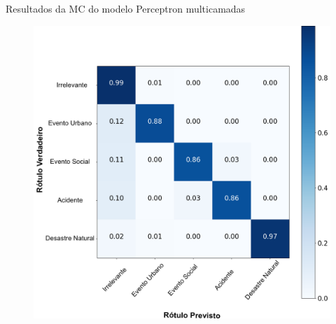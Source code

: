 \documentclass{beamer}
\begin{document}
\begin{frame}{Resultados da MC do modelo Perceptron multicamadas}
\begin{figure}[!htb]%
	\centering
		\includegraphics[width=0.66\linewidth]{confusion_matrix_mlp_pt.png}
	\label{fig:pizza_bus}
\end{figure}
\end{frame}
\end{document}
